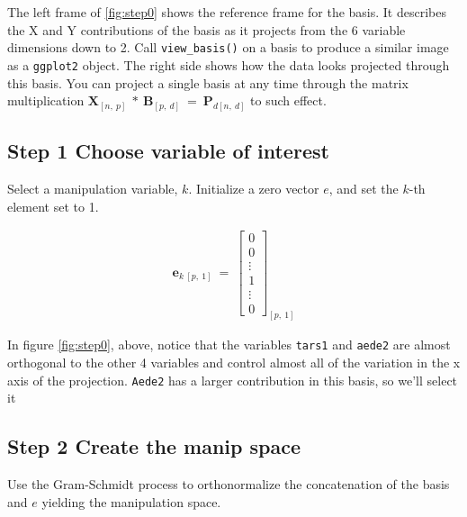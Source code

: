 \documentclass{monashthesis}
\begin{document}
The left frame of \ref{fig:step0} shows the reference frame for the basis. It describes the X and Y contributions of the basis as it projects from the 6 variable dimensions down to 2. Call \texttt{view\_basis()} on a basis to produce a similar image as a \texttt{ggplot2} object. The right side shows how the data looks projected through this basis. You can project a single basis at any time through the matrix multiplication \(\textbf{X}_{[n,~p]} ~*~ \textbf{B}_{[p,~d]} ~=~ \textbf{P}_{d[n,~d]}\) to such effect.

\hypertarget{step-1-choose-variable-of-interest}{%
\subsection{Step 1 Choose variable of interest}\label{step-1-choose-variable-of-interest}}

Select a manipulation variable, \(k\). Initialize a zero vector \(e\), and set the \(k\)-th element set to 1.

\begin{align*}
\textbf{e}_{k~[p,~1]} ~=~ 
  \begin{bmatrix}
    0 \\
    0 \\
    \vdots \\
    1 \\
    \vdots \\
    0
  \end{bmatrix}_{[p,~1]}
\end{align*}

In figure \ref{fig:step0}, above, notice that the variables \texttt{tars1} and \texttt{aede2} are almost orthogonal to the other 4 variables and control almost all of the variation in the x axis of the projection. \texttt{Aede2} has a larger contribution in this basis, so we'll select it

\hypertarget{step-2-create-the-manip-space}{%
\subsection{Step 2 Create the manip space}\label{step-2-create-the-manip-space}}

Use the Gram-Schmidt process to orthonormalize the concatenation of the basis and \(e\) yielding the manipulation space.
\end{document}
